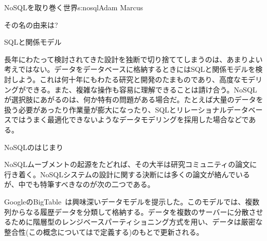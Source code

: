 \begin{aosachapter}{NoSQLを取り巻く世界}{s:nosql}{Adam Marcus}
\begin{aosasect1}{その名の由来は?}
\begin{aosasect2}{SQLと関係モデル}
\begin{aosaitemize}
\end{aosaitemize}

長年にわたって検討されてきた設計を独断で切り捨ててしまうのは、あまりよい考えではない。データをデータベースに格納するときにはSQLと関係モデルを検討しよう。これは何十年にもわたる研究と開発のたまものであり、高度なモデリングができる。また、複雑な操作も容易に理解できることは請け合う。NoSQLが選択肢にあがるのは、何か特有の問題がある場合だ。たとえば大量のデータを扱う必要があったり作業量が膨大になったり、SQLとリレーショナルデータベースではうまく最適化できないようなデータモデリングを採用した場合などである。

\end{aosasect2}

\begin{aosasect2}{NoSQLのはじまり}

NoSQLムーブメントの起源をたどれば、その大半は研究コミュニティの論文に行き着く。NoSQLシステムの設計に関する決断には多くの論文が絡んでいるが、中でも特筆すべきなのが次の二つである。

GoogleのBigTable~\cite{bib:bigtable}は興味深いデータモデルを提示した。このモデルでは、複数列からなる履歴データを分類して格納する。データを複数のサーバーに分散させるために階層型のレンジベースパーティショニング方式を用い、データは厳密な整合性(この概念についてはで定義する)のもとで更新される。


\end{aosasect2}
\end{aosasect1}
\end{aosachapter}
